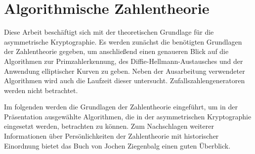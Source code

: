 \chapter*{Algorithmische Zahlentheorie}\label{Algorithmische Zahlentheorie}
	Diese Arbeit beschäftigt sich mit der theoretischen Grundlage für die asymmetrische Kryptographie. Es werden zunächst die benötigten Grundlagen der Zahlentheorie gegeben, um anschließend einen genaueren Blick auf die Algorithmen zur Primzahlerkennung, des Diffie-Hellmann-Austausches und der Anwendung elliptischer Kurven zu geben. Neben der Ausarbeitung verwendeter Algorithmen wird auch die Laufzeit dieser untersucht. Zufallszahlengeneratoren werden nicht betrachtet.
		
	\wupp Im folgenden werden die Grundlagen der Zahlentheorie eingeführt, um in der Präsentation ausgewählte Algorithmen, die in der asymmetrischen Kryptographie eingesetzt werden, betrachten zu können. Zum Nachschlagen weiterer Informationen über Persönlichkeiten der Zahlentheorie mit historischer Einordnung bietet das Buch \cite{Elementare:Zahlentheorie} von Jochen Ziegenbalg einen guten Überblick.
